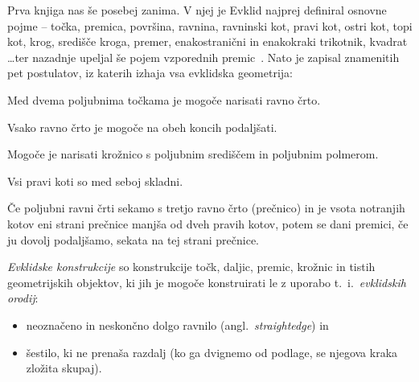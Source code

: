 Prva knjiga nas še posebej zanima. V njej je Evklid najprej definiral osnovne pojme -- točka, premica, površina, ravnina, ravninski kot, pravi kot, ostri kot, topi kot, krog, središče kroga, premer, enakostranični in enakokraki trikotnik, kvadrat \ldots ter nazadnje upeljal še pojem vzporednih premic~\cite{euclidI}. Nato je zapisal znamenitih pet postulatov, iz katerih izhaja vsa evklidska geometrija:

\renewcommand{\thepostulat}{P\arabic{postulat}}

\begin{postulat}
    \label{post:P1}
    Med dvema poljubnima točkama je mogoče narisati ravno črto.
\end{postulat}
\begin{postulat}
    \label{post:P2}
    Vsako ravno črto je mogoče na obeh koncih podaljšati.
\end{postulat}
\begin{postulat}
    \label{post:P3}
    Mogoče je narisati krožnico s poljubnim središčem in poljubnim polmerom.
\end{postulat}
\begin{postulat}
    \label{post:P4}
    Vsi pravi koti so med seboj skladni.
\end{postulat}
\begin{postulat}
    \label{post:P5}
    Če poljubni ravni črti sekamo s tretjo ravno črto (prečnico) in je vsota notranjih kotov eni strani prečnice manjša od dveh pravih kotov, potem se dani premici, če ju dovolj podaljšamo, sekata na tej strani prečnice.
\end{postulat}

\begin{definicija}
    \emph{Evklidske konstrukcije} so konstrukcije točk, daljic, premic, krožnic in tistih geometrijskih objektov, ki jih je mogoče konstruirati le z uporabo t.\ i.\ \emph{evklidskih orodij}:
    \begin{itemize}
        \item neoznačeno in neskončno dolgo ravnilo (angl.\ \emph{straightedge}) in
        \item šestilo, ki ne prenaša razdalj (ko ga dvignemo od podlage, se njegova kraka zložita skupaj).
    \end{itemize}
\end{definicija}

